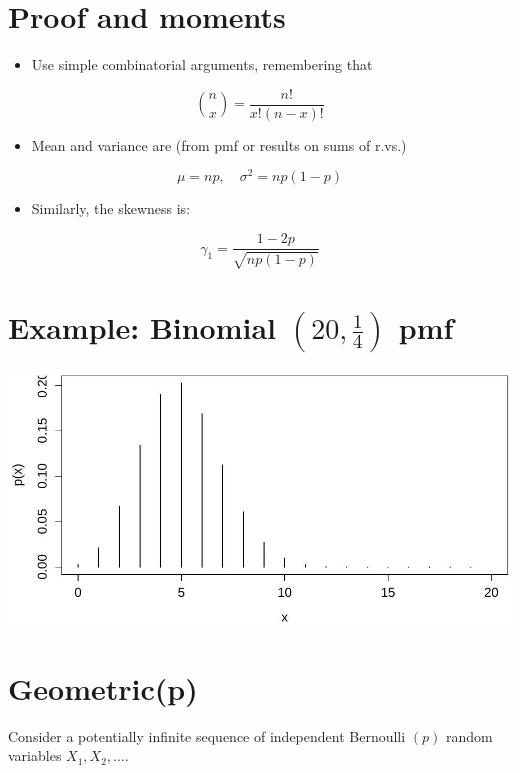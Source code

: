 \documentclass[10pt]{article}
\begin{document}
\section*{Proof and moments}
\begin{itemize}
  \item Use simple combinatorial arguments, remembering that
\end{itemize}

$$
\binom{n}{x}=\frac{n!}{x!(n-x)!}
$$

\begin{itemize}
  \item Mean and variance are (from pmf or results on sums of r.vs.)
\end{itemize}

$$
\mu=n p, \quad \sigma^{2}=n p(1-p)
$$

\begin{itemize}
  \item Similarly, the skewness is:
\end{itemize}

$$
\gamma_{1}=\frac{1-2 p}{\sqrt{n p(1-p)}}
$$

\section*{Example: Binomial $(20, \frac{1}{4})$ pmf}
\begin{center}
\includegraphics[max width=\textwidth]{2025_05_11_35704811148ad612caa6g-30}
\end{center}

\section*{Geometric(p)}
Consider a potentially infinite sequence of independent Bernoulli $(p)$ random variables $X_{1}, X_{2}, \ldots$.
\end{document}
